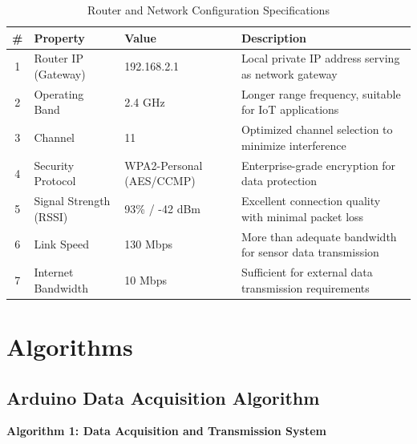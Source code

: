 \begin{table}[h!]
	\centering
	\caption{Router and Network Configuration Specifications}
	\label{tab:router_specs}
	\begin{tabular}{|c|l|l|p{3cm}|}
		\hline
		\textbf{\#} & \textbf{Property} & \textbf{Value} & \textbf{Description} \\ \hline
		1 & Router IP (Gateway) & 192.168.2.1 & Local private IP address serving as network gateway \\ \hline
		2 & Operating Band & 2.4 GHz & Longer range frequency, suitable for IoT applications \\ \hline
		3 & Channel & 11 & Optimized channel selection to minimize interference \\ \hline
		4 & Security Protocol & WPA2-Personal (AES/CCMP) & Enterprise-grade encryption for data protection \\ \hline
		5 & Signal Strength (RSSI) & 93\% / -42 dBm & Excellent connection quality with minimal packet loss \\ \hline
		6 & Link Speed & 130 Mbps & More than adequate bandwidth for sensor data transmission \\ \hline
		7 & Internet Bandwidth & 10 Mbps & Sufficient for external data transmission requirements \\ \hline
	\end{tabular}
\end{table}

\clearpage 


\section{Algorithms}
\subsection{Arduino Data Acquisition Algorithm}
\label{subsec:arduino-algorithm}

\noindent\textbf{Algorithm 1: Data Acquisition and Transmission System}

